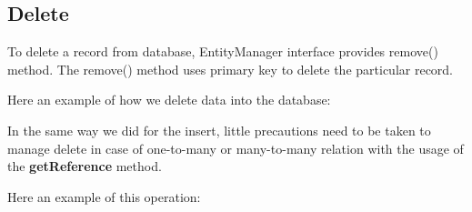 \documentclass[a4paper]{article}
\begin{document}
\subsection{Delete}
To delete a record from database, EntityManager interface provides remove() method. The remove() method uses primary key to delete the particular record.

Here an example of how we delete data into the database:


In the same way we did for the insert, little precautions need to be taken to manage delete in case of one-to-many or many-to-many relation with the usage of the \textbf{getReference} method.

Here an example of this operation:

\end{document}
